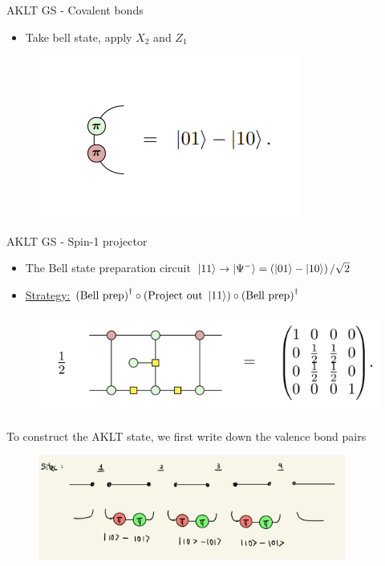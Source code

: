 \documentclass[aspectratio=169,xcolor=dvipsnames, t]{beamer}
\begin{document}
\begin{frame}{AKLT GS - Covalent bonds}
\begin{itemize}
    \item Take bell state, apply $X_2$ and $Z_1$ 
\end{itemize}
\begin{figure}
    \centering
    \includegraphics[width=.5\textwidth]{figures/covalent_bond.png}
\end{figure}
\end{frame}

\begin{frame}{AKLT GS - Spin-1 projector}
    \begin{itemize}
        \item The Bell state preparation circuit $\ket{11} \to \ket{\Psi^{-}}= \left(\ket{01} - \ket{10}\right)/\sqrt{2}$
        \item \underline{Strategy:} $\text{(Bell prep)}^{\dagger} \circ (\text{Project out } \ket{11}) \circ \text{(Bell prep)}^{\dagger}$
    \end{itemize}
    \begin{figure}
        \centering
        \includegraphics[width=.8\textwidth]{figures/spin_one_proj.png}
    \end{figure}
\end{frame}

\begin{frame}
    To construct the AKLT state, we first write down the valence bond pairs
    \begin{figure}
        \includegraphics[width=0.9\textwidth]{figures/aklt_valence_bond.PNG}
    \end{figure}
\end{frame}
\end{document}
